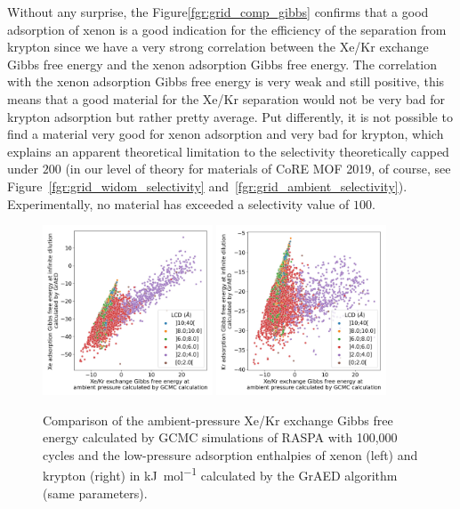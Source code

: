 \documentclass[main]{subfiles}
\begin{document}
Without any surprise, the Figure\ref{fgr:grid_comp_gibbs} confirms that a good adsorption of xenon is a good indication for the efficiency of the separation from krypton since we have a very strong correlation between the Xe/Kr exchange Gibbs free energy and the xenon adsorption Gibbs free energy. The correlation with the xenon adsorption Gibbs free energy is very weak and still positive, this means that a good material for the Xe/Kr separation would not be very bad for krypton adsorption but rather pretty average. Put differently, it is not possible to find a material very good for xenon adsorption and very bad for krypton, which explains an apparent theoretical limitation to the selectivity theoretically capped under $200$ (in our level of theory for materials of CoRE MOF 2019, of course, see Figure~\ref{fgr:grid_widom_selectivity} and~\ref{fgr:grid_ambient_selectivity}). Experimentally, no material has exceeded a selectivity value of $100$.

\begin{figure}[ht]
  \centering
    \includegraphics[width=0.45\textwidth]{figures/3-fastsim/G_2080_vs_H_Xe_grid_overview.jpg}
    \includegraphics[width=0.45\textwidth]{figures/3-fastsim/G_2080_vs_H_Kr_grid_overview.jpg}
    \caption{Comparison of the ambient-pressure Xe/Kr exchange Gibbs free energy calculated by GCMC simulations of RASPA with 100,000 cycles and the low-pressure adsorption enthalpies of xenon (left) and krypton (right) in \si{\kilo\joule\per\mole} calculated by the GrAED algorithm (same parameters).}\label{fgr:grid_comp_enthalpy}
\end{figure}
\end{document}
